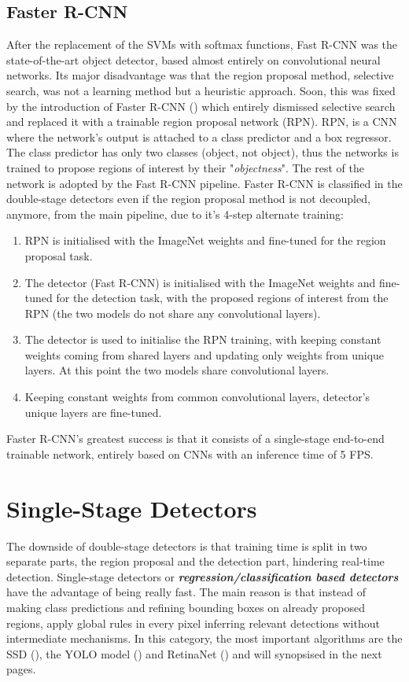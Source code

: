 \subsection{Faster R-CNN}
After the replacement of the SVMs with softmax functions, Fast R-CNN was the state-of-the-art object detector, based almost entirely on convolutional neural networks. Its major disadvantage was that the region proposal method, selective search, was not a learning method but a heuristic approach. Soon, this was fixed by the introduction of Faster R-CNN (\cite{ren2015faster}) which entirely dismissed selective search and replaced it with a trainable region proposal network (RPN). RPN, is a CNN where the network's output is attached to a class predictor and a box regressor. The class predictor has only two classes (object, not object), thus the networks is trained to propose regions of interest by their "\textit{objectness}". The rest of the network is adopted by the Fast R-CNN pipeline. Faster R-CNN is classified in the double-stage detectors even if the region proposal method is not decoupled, anymore, from the main pipeline, due to it's 4-step alternate training:
 
\begin{enumerate}
  \item RPN is initialised with the ImageNet weights and fine-tuned for the region proposal task.
  \item The detector (Fast R-CNN) is initialised with the ImageNet weights and fine-tuned for the detection task, with the proposed regions of interest from the RPN (the two models do not share any convolutional layers).
  \item The detector is used to initialise the RPN training, with keeping constant weights coming from shared layers and updating only weights from unique layers. At this point the two models share convolutional layers.
  \item Keeping constant weights from common convolutional layers, detector's unique layers are fine-tuned. 
\end{enumerate}

Faster R-CNN's greatest success is that it consists of a single-stage end-to-end trainable network, entirely based on CNNs with an inference time of 5 FPS.


\section{Single-Stage Detectors}
The downside of double-stage detectors is that training time is split in two separate parts, the region proposal and the detection part, hindering real-time detection. Single-stage detectors or \textbf{\textit{regression/classification based detectors}} have the advantage of being really fast. The main reason is that instead of making class predictions and refining bounding boxes on already proposed regions, apply global rules in every pixel inferring relevant detections without intermediate mechanisms. In this category, the most important algorithms are the SSD (\cite{liu2016ssd}), the YOLO model (\cite{redmon2016you}) and RetinaNet (\cite{lin2017focal}) and will synopsised in the next pages.
 

